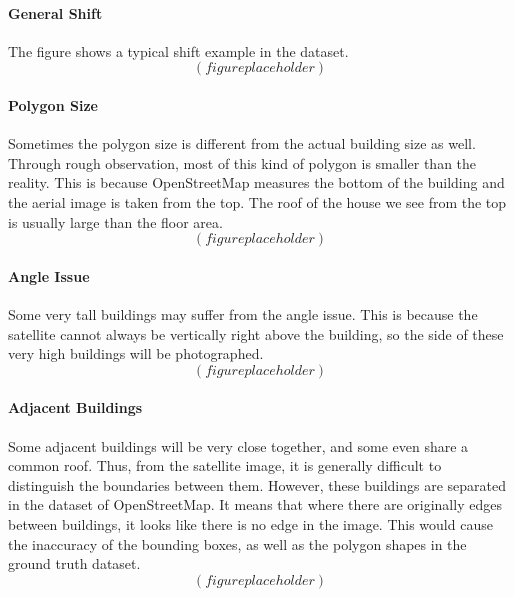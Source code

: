 \paragraph{General Shift}
The figure shows a typical shift example in the dataset.
$$(figure placeholder)$$

\paragraph{Polygon Size}
Sometimes the polygon size is different from the actual building size as well. Through rough observation, most of this kind of polygon is smaller than the reality. This is because OpenStreetMap measures the bottom of the building and the aerial image is taken from the top. The roof of the house we see from the top is usually large than the floor area.
$$(figure placeholder)$$

\paragraph{Angle Issue}
Some very tall buildings may suffer from the angle issue. This is because the satellite cannot always be vertically right above the building, so the side of these very high buildings will be photographed.
$$(figure placeholder)$$

\paragraph{Adjacent Buildings}
Some adjacent buildings will be very close together, and some even share a common roof. Thus, from the satellite image, it is generally difficult to distinguish the boundaries between them. However, these buildings are separated in the dataset of OpenStreetMap. It means that where there are originally edges between buildings, it looks like there is no edge in the image. This would cause the inaccuracy of the bounding boxes, as well as the polygon shapes in the ground truth dataset.
$$(figure placeholder)$$

